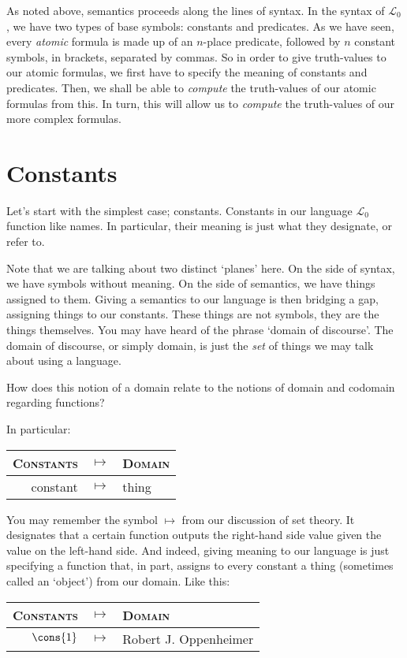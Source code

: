 As noted above, semantics proceeds along the lines of syntax. In the syntax of $\mathcal{L}_0$, we have two types of base symbols: constants and predicates. As we have seen, every \textit{atomic} formula is made up of an $n$-place predicate, followed by $n$ constant symbols, in brackets, separated by commas. So in order to give truth-values to our atomic formulas, we first have to specify the meaning of constants and predicates. Then, we shall be able to \textit{compute} the truth-values of our atomic formulas from this. In turn, this will allow us to \textit{compute} the truth-values of our more complex formulas. 

\section{Constants}

Let's start with the simplest case; constants. Constants in our language $\mathcal{L}_0$ function like names. In particular, their meaning is just what they designate, or refer to. 

Note that we are talking about two distinct `planes' here. On the side of syntax, we have symbols without meaning. On the side of semantics, we have things assigned to them. Giving a semantics to our language is then bridging a gap, assigning things to our constants. These things are not symbols, they are the things themselves. You may have heard of the phrase `domain of discourse'. The domain of discourse, or simply domain, is just the \textit{set} of things we may talk about using a language.

\begin{exc}
How does this notion of a domain relate to the notions of domain and codomain regarding functions?
\end{exc}

 In particular:

\begin{center}
\begin{tabular}{rcl}
	\textsc{Constants} & $\mapsto$ & \textsc{Domain}\\\hline
	constant & $\mapsto$ & thing
\end{tabular}
\end{center}

You may remember the symbol $\mapsto$ from our discussion of set theory. It designates that a certain function outputs the right-hand side value given the value on the left-hand side. And indeed, giving meaning to our language is just specifying a function that, in part, assigns to every constant a thing (sometimes called an `object') from our domain. Like this:
\begin{center}
	\begin{tabular}{rcl}
		\textsc{Constants} & $\mapsto$ & \textsc{Domain}\\\hline
		$\cons{1}$ & $\mapsto$ & Robert J. Oppenheimer
	\end{tabular}
\end{center}

